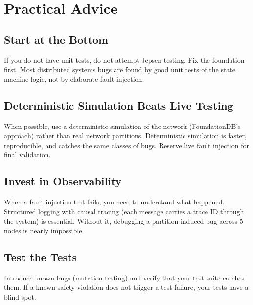 \section{Practical Advice}


\subsection{Start at the Bottom}

If you do not have unit tests, do not attempt Jepsen testing. Fix the foundation first.
Most distributed systems bugs are found by good unit tests of the state machine logic,
not by elaborate fault injection.

\subsection{Deterministic Simulation Beats Live Testing}

When possible, use a deterministic simulation of the network (FoundationDB's approach)
rather than real network partitions. Deterministic simulation is faster, reproducible,
and catches the same classes of bugs. Reserve live fault injection for final validation.

\subsection{Invest in Observability}

When a fault injection test fails, you need to understand what happened. Structured
logging with causal tracing (each message carries a trace ID through the system) is
essential. Without it, debugging a partition-induced bug across 5 nodes is nearly
impossible.

\subsection{Test the Tests}

Introduce known bugs (mutation testing) and verify that your test suite catches them.
If a known safety violation does not trigger a test failure, your tests have a blind
spot.

